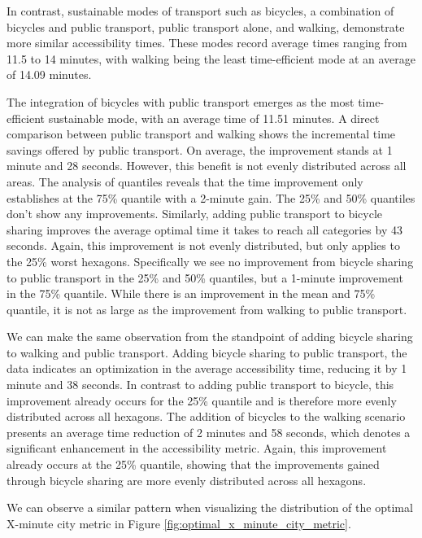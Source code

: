In contrast, sustainable modes of transport such as bicycles, a combination of bicycles and public transport, public transport alone, and walking, demonstrate more similar accessibility times. 
These modes record average times ranging from 11.5 to 14 minutes, with walking being the least time-efficient mode at an average of 14.09 minutes. 

The integration of bicycles with public transport emerges as the most time-efficient sustainable mode, with an average time of 11.51 minutes. 
A direct comparison between public transport and walking shows the incremental time savings offered by public transport. 
On average, the improvement stands at 1 minute and 28 seconds. 
However, this benefit is not evenly distributed across all areas.
The analysis of quantiles reveals that the time improvement only establishes at the 75\% quantile with a 2-minute gain.
The 25\% and 50\% quantiles don't show any improvements.
Similarly, adding public transport to bicycle sharing improves the average optimal time it takes to reach all categories by 43 seconds.
Again, this improvement is not evenly distributed, but only applies to the 25\% worst hexagons.
Specifically we see no improvement from bicycle sharing to public transport in the 25\% and 50\% quantiles, but a 1-minute improvement in the 75\% quantile.
While there is an improvement in the mean and 75\% quantile, it is not as large as the improvement from walking to public transport.

We can make the same observation from the standpoint of adding bicycle sharing to walking and public transport.
Adding bicycle sharing to public transport, the data indicates an optimization in the average accessibility time, reducing it by 1 minute and 38 seconds.
In contrast to adding public transport to bicycle, this improvement already occurs for the 25\% quantile and is therefore more evenly distributed across all hexagons.
The addition of bicycles to the walking scenario presents an average time reduction of 2 minutes and 58 seconds, which denotes a significant enhancement in the accessibility metric. 
Again, this improvement already occurs at the 25\% quantile, showing that the improvements gained through bicycle sharing are more evenly distributed across all hexagons.


We can observe a similar pattern when visualizing the distribution of the optimal X-minute city metric in Figure \ref{fig:optimal_x_minute_city_metric}.

